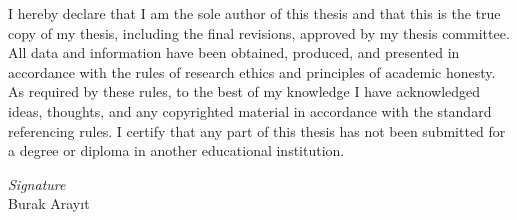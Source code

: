\noindent
I hereby declare that I am the sole author of this thesis and that this is the true copy of my thesis, including the final revisions, approved by my thesis committee. All data and information have been obtained, produced, and presented in accordance with the rules of research ethics and principles of academic honesty. As required by these rules, to the best of my knowledge I have acknowledged ideas, thoughts, and any copyrighted material in accordance with the standard referencing rules. I certify that any part of this thesis has not been submitted for a degree or diploma in another educational institution.

\vspace{1cm}
\noindent
\textit{Signature}\\
Burak Aray{\i}t

